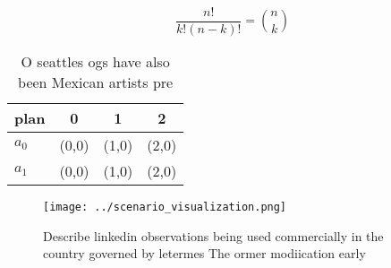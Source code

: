 \documentclass[a4paper]{article}
\begin{document}
\[ \frac{n!}{k!(n-k)!} = \binom{n}{k} \]

\begin{table}
\begin{adjustbox}{width=0.6\columnwidth}
\begin{tabular}{|l|l|l|l|}
\hline
\textbf{plan} & \multicolumn{1}{c|}{\textbf{0}} & \multicolumn{1}{c|}{\textbf{1}} & \multicolumn{1}{c|}{\textbf{2}} \\ \hline
\textbf{$a_0$}  & (0,0) & (1,0) & (2,0) \\ \hline
\textbf{$a_1$}  & (0,0) & (1,0) & (2,0) \\ \hline
\end{tabular}
\end{adjustbox}
\caption{O seattles ogs have also been Mexican artists pre
}
\end{table}

\begin{figure}
\centering
\texttt{[image: ../scenario\_visualization.png]}
\caption{Describe linkedin observations being used commercially in the country governed by letermes The ormer modiication early 
}
\end{figure}
 
\end{document}
